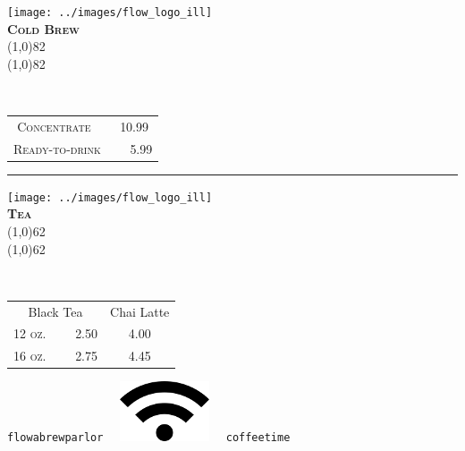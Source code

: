 \documentclass[letterpaper, 12pt]{article}%
\newcommand{\ill}{
\texttt{[image: ../images/flow\_logo\_ill]} %
}
\newcommand{\menuentry}[2]{
 \emph{#1}\\  %
 \vspace*{\fill}
 {#2} %
}
\newcommand{\menuitem}[4]{
 \centering
  \ill\\ 
  \smallskip\vspace{0.1em}
  \textbf{\sffamily \textsc{\large#2}}\vspace{-1ex}\\ 
  \line(1,0){#1}\vspace{-2ex}\\ 
  \line(1,0){#1}\vspace{0.5ex}\\ 
  \smallskip
  \menuentry{#3}{#4}
}
\newcommand{\flowtherefore}{~~\raisebox{0.2ex}{$\therefore$}~~}
\newcommand{\price}[2]{
 \textsc{\small#1}\flowtherefore
 \textsc{#2}
}
\newcommand{\varprice}[1]{
 \textsc{#1}
}
\begin{document}
\newlength{\coffeerowtwo}
\setlength{\coffeerowtwo}{0.18\textwidth}
{\centering
   
    
 \begin{minipage}[t][\coffeerowtwo][b]{0.3\textwidth}
  \centering
  \menuitem{82}{
   Cold Brew}{\vspace{-1ex}
   }{
   \begin{tabular}{@{} c @{}}
   \price{Concentrate}{10.99}\\ 
   \price{Ready-to-drink}{5.99}\\ 
   \end{tabular}
   
   \rule{0pt}{2.2em}
    
  }
 \end{minipage} 
 \rule{3em}{0pt}
 \begin{minipage}[t][\coffeerowtwo][b]{0.3\textwidth}
  \centering
  \menuitem{62}{
   Tea}{
   }{
   \begin{tabular}{@{} c c @{}}
   Black Tea & Chai Latte\\ 
   \price{12 oz.}{2.50} & \varprice{4.00}\\ 
   \price{16 oz.}{2.75} & \varprice{4.45}\\ 
   \end{tabular}
   
   \rule{0pt}{1.2em}
    
  }
 \end{minipage} 
 
}



{\centering
 \texttt{\large flowabrewparlor}
 ~~\includegraphics{wifi}~~
 \texttt{\large coffeetime}
 \vspace{0.5em}
 
} 
\end{document}
